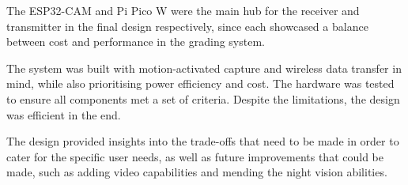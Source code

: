 \documentclass[class=report,11pt,crop=false]{standalone}
\begin{document}
The ESP32-CAM and Pi Pico W were the main hub for the receiver and transmitter in the final design respectively, since each showcased a balance between cost and performance in the grading system. 

The system was built with motion-activated capture and wireless data transfer in mind, while also prioritising power efficiency and cost. The hardware was tested to ensure all components met a set of criteria. Despite the limitations, the design was efficient in the end. 

The design provided insights into the trade-offs that need to be made in order to cater for the specific user needs, as well as future improvements that could be made, such as adding video capabilities and mending the night vision abilities. 

\ifstandalone

\printnoidxglossary[type=\acronymtype,nonumberlist]
\fi
\end{document}
